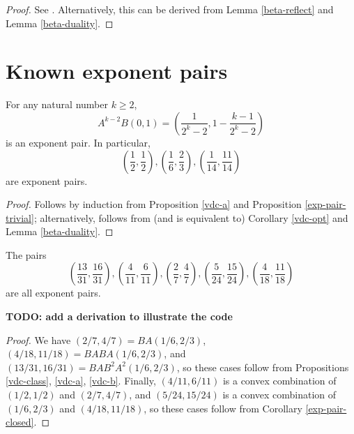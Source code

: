 \literature
{}

\begin{proof}  See \cite[Lemma 2.9]{ivic}.  Alternatively, this can be derived from Lemma \ref{beta-reflect} and Lemma \ref{beta-duality}.
\end{proof}


\section{Known exponent pairs}


\begin{proposition}\label{vdc-class} For any natural number $k \geq 2$,
    $$ A^{k-2} B(0,1) = \left( \frac{1}{2^k-2}, 1 - \frac{k-1}{2^k-2} \right)$$
    is an exponent pair.  In particular,
    $$ \left(\frac{1}{2}, \frac{1}{2}\right), \left(\frac{1}{6}, \frac{2}{3}\right), \left(\frac{1}{14}, \frac{11}{14}\right)$$
    are exponent pairs.
    \end{proposition}

    \begin{proof} Follows by induction from Proposition \ref{vdc-a} and Proposition \ref{exp-pair-trivial}; alternatively, follows from (and is equivalent to) Corollary \ref{vdc-opt} and Lemma \ref{beta-duality}.
    \end{proof}

\derived
{}

\begin{corollary}\label{add-exponential}  The pairs
$$ \left(\frac{13}{31}, \frac{16}{31}\right), (\frac{4}{11},\frac{6}{11}), (\frac{2}{7},\frac{4}{7}), (\frac{5}{24},\frac{15}{24}), (\frac{4}{18},\frac{11}{18})$$
are all exponent pairs.
\end{corollary}

{\bf TODO: add a derivation to illustrate the code}

\begin{proof} We have $(2/7,4/7) = BA(1/6,2/3)$, $(4/18,11/18) = BABA(1/6,2/3)$, and $(13/31, 16/31)=BAB^2A^2(1/6,2/3)$, so these cases follow from Propositions \ref{vdc-class}, \ref{vdc-a}, \ref{vdc-b}. Finally, $(4/11,6/11)$ is a convex combination of $(1/2,1/2)$ and $(2/7,4/7)$, and $(5/24, 15/24)$ is a convex combination of $(1/6,2/3)$ and $(4/18, 11/18)$, so these cases follow from Corollary \ref{exp-pair-closed}.
\end{proof}


